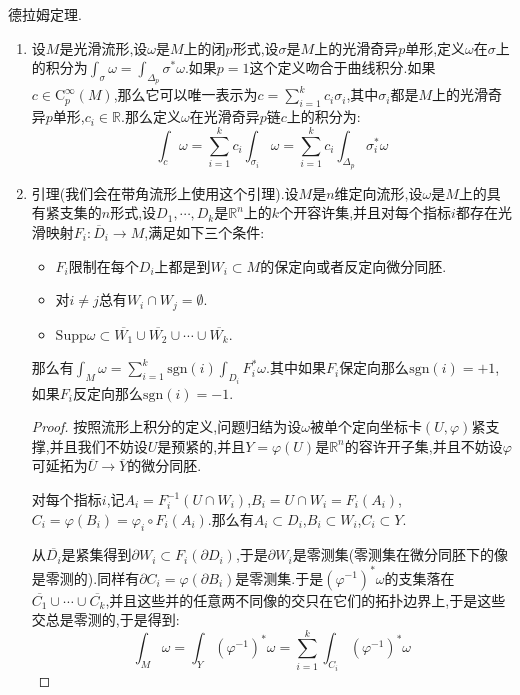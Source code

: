 德拉姆定理.
\begin{enumerate}
	\item 设$M$是光滑流形,设$\omega$是$M$上的闭$p$形式,设$\sigma$是$M$上的光滑奇异$p$单形,定义$\omega$在$\sigma$上的积分为$\int_{\sigma}\omega=\int_{\Delta_p}\sigma^*\omega$.如果$p=1$这个定义吻合于曲线积分.如果$c\in\mathrm{C}_p^{\infty}(M)$,那么它可以唯一表示为$c=\sum_{i=1}^kc_i\sigma_i$,其中$\sigma_i$都是$M$上的光滑奇异$p$单形,$c_i\in\mathbb{R}$.那么定义$\omega$在光滑奇异$p$链$c$上的积分为:
	$$\int_c\omega=\sum_{i=1}^kc_i\int_{\sigma_i}\omega=\sum_{i=1}^kc_i\int_{\Delta_p}\sigma_i^*\omega$$
	\item 引理(我们会在带角流形上使用这个引理).设$M$是$n$维定向流形,设$\omega$是$M$上的具有紧支集的$n$形式,设$D_1,\cdots,D_k$是$\mathbb{R}^n$上的$k$个开容许集,并且对每个指标$i$都存在光滑映射$F_i:\overline{D}_i\to M$,满足如下三个条件:
	\begin{itemize}
		\item $F_i$限制在每个$D_i$上都是到$W_i\subset M$的保定向或者反定向微分同胚.
		\item 对$i\not=j$总有$W_i\cap W_j=\emptyset$.
		\item $\mathrm{Supp}\omega\subset\overline{W_1}\cup\overline{W_2}\cup\cdots\cup\overline{W_k}$.
	\end{itemize}

    那么有$\int_M\omega=\sum_{i=1}^k\mathrm{sgn}(i)\int_{D_i}F_i^*\omega$.其中如果$F_i$保定向那么$\mathrm{sgn}(i)=+1$,如果$F_i$反定向那么$\mathrm{sgn}(i)=-1$.
    \begin{proof}
    	
    	按照流形上积分的定义,问题归结为设$\omega$被单个定向坐标卡$(U,\varphi)$紧支撑,并且我们不妨设$U$是预紧的,并且$Y=\varphi(U)$是$\mathbb{R}^n$的容许开子集,并且不妨设$\varphi$可延拓为$\overline{U}\to\overline{Y}$的微分同胚.
    	
    	对每个指标$i$,记$A_i=F_i^{-1}(U\cap W_i)$,$B_i=U\cap W_i=F_i(A_i)$,$C_i=\varphi(B_i)=\varphi_i\circ F_i(A_i)$.那么有$A_i\subset D_i$,$B_i\subset W_i$,$C_i\subset Y$.
    	
    	从$\overline{D_i}$是紧集得到$\partial W_i\subset F_i(\partial D_i)$,于是$\partial W_i$是零测集(零测集在微分同胚下的像是零测的).同样有$\partial C_i=\varphi(\partial B_i)$是零测集.于是$(\varphi^{-1})^*\omega$的支集落在$\overline{C_1}\cup\cdots\cup\overline{C_k}$,并且这些并的任意两不同像的交只在它们的拓扑边界上,于是这些交总是零测的,于是得到:
    	$$\int_M\omega=\int_Y(\varphi^{-1})^*\omega=\sum_{i=1}^k\int_{C_i}(\varphi^{-1})^*\omega$$
    	

\end{proof}
\end{enumerate}
